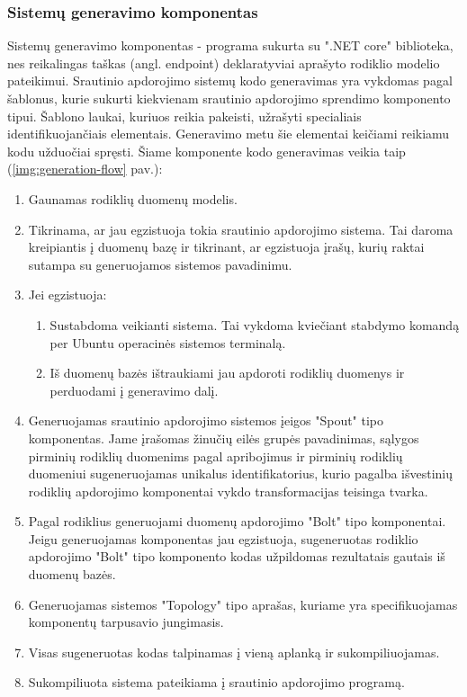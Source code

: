\documentclass{VUMIFPSbakalaurinis}
\begin{document}
\subsubsection{Sistemų generavimo komponentas}

Sistemų generavimo komponentas - programa sukurta su ".NET core" biblioteka, nes reikalingas taškas (angl. endpoint) deklaratyviai aprašyto rodiklio modelio pateikimui. Srautinio apdorojimo sistemų kodo generavimas yra vykdomas pagal šablonus, kurie sukurti kiekvienam srautinio apdorojimo sprendimo komponento tipui. Šablono laukai, kuriuos reikia pakeisti, užrašyti specialiais identifikuojančiais elementais. Generavimo metu šie elementai keičiami reikiamu kodu užduočiai spręsti.
Šiame komponente kodo generavimas veikia taip (\ref{img:generation-flow} pav.):

\begin{enumerate}
    \item Gaunamas rodiklių duomenų modelis.
    \item Tikrinama, ar jau egzistuoja tokia srautinio apdorojimo sistema. Tai daroma kreipiantis į duomenų bazę ir tikrinant, ar egzistuoja įrašų, kurių raktai sutampa su generuojamos sistemos pavadinimu.
    \item Jei egzistuoja:
        \begin{enumerate}
            \item Sustabdoma veikianti sistema. Tai vykdoma kviečiant stabdymo komandą per Ubuntu operacinės sistemos terminalą.
            \item Iš duomenų bazės ištraukiami jau apdoroti rodiklių duomenys ir perduodami į generavimo dalį.
        \end{enumerate} 
    \item Generuojamas srautinio apdorojimo sistemos įeigos "Spout" tipo komponentas. Jame įrašomas žinučių eilės grupės pavadinimas, sąlygos pirminių rodiklių duomenims pagal apribojimus ir pirminių rodiklių duomeniui sugeneruojamas unikalus identifikatorius, kurio pagalba išvestinių rodiklių apdorojimo komponentai vykdo transformacijas teisinga tvarka.
    \item Pagal rodiklius generuojami duomenų apdorojimo "Bolt" tipo komponentai. Jeigu generuojamas komponentas jau egzistuoja, sugeneruotas rodiklio apdorojimo "Bolt" tipo komponento kodas užpildomas rezultatais gautais iš duomenų bazės. 
    \item Generuojamas sistemos "Topology" tipo aprašas, kuriame yra specifikuojamas komponentų tarpusavio jungimasis. 
    \item Visas sugeneruotas kodas talpinamas į vieną aplanką ir sukompiliuojamas.
    \item Sukompiliuota sistema pateikiama į srautinio apdorojimo programą.
\end{enumerate}
\end{document}
